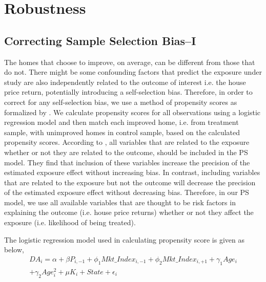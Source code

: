 \documentclass[AEJ,reqno, draftmode]{AEA} %
\begin{document}


\section{Robustness}

\subsection{Correcting Sample Selection Bias--I}

The homes that choose to improve, on average, can be different from those that do not. There might be some confounding factors that predict the exposure under study are also independently related to the outcome of interest i.e. the house price return, potentially introducing a self-selection bias. Therefore, in order to correct for any self-selection bias, we use a method of propensity scores as formalized by \cite{rosenbaum1983central}. We calculate propensity scores for all observations using a logistic regression model and then match each improved home, i.e. from treatment sample, with unimproved homes in control sample, based on the calculated propensity scores. According to \citet{brookhart2006variable}, all variables that are related to the exposure whether or not they are related to the outcome, should be included in the PS model. They find that inclusion of these variables increase the precision of the estimated exposure effect without increasing bias. In contrast, including variables that are related to the exposure but not the outcome will decrease the precision of the estimated exposure effect without decreasing bias. Therefore, in our PS model, we use all available variables that are thought to be risk factors in explaining the outcome (i.e. house price returns) whether or not they affect the exposure (i.e. likelihood of being treated).

The logistic regression model used in calculating propensity score is given as below, \begin{equation} \label{eqn:logistic}
\begin{aligned}
    DA_i = \alpha + \beta{P_{i,-1}}  + \phi_1{Mkt\_Index_{i,-1}} + \phi_2{Mkt\_Index_{i,+1}} + \gamma_1{Age_i} \\+ \gamma_2{Age_i^2} +  \mu{K_i} + State + \epsilon_i
\end{aligned}
\end{equation}
\end{document}
